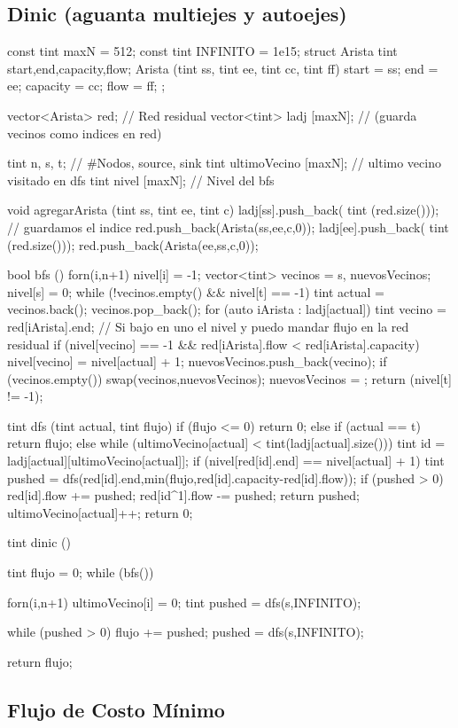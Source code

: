 \subsection{Dinic (aguanta multiejes y autoejes)}
\begin{code}
const tint maxN = 512;
const tint INFINITO = 1e15;
struct Arista
{
	tint start,end,capacity,flow;
	Arista (tint ss, tint ee, tint cc, tint ff)
	{
		start = ss;
		end = ee;
		capacity = cc;
		flow = ff;
	}
};

vector<Arista>  red; // Red residual
vector<tint> ladj [maxN]; // (guarda vecinos como indices en red)

tint n, s, t; // #Nodos, source, sink
tint ultimoVecino [maxN]; // ultimo vecino visitado en dfs
tint nivel [maxN]; // Nivel del bfs

void agregarArista (tint ss, tint ee, tint c)
{
	ladj[ss].push_back( tint (red.size())); // guardamos el indice
	red.push_back(Arista(ss,ee,c,0));
	ladj[ee].push_back( tint (red.size()));
	red.push_back(Arista(ee,ss,c,0));
}


bool bfs ()
{
	forn(i,n+1)
		nivel[i] = -1;
	vector<tint> vecinos = {s}, nuevosVecinos;
	nivel[s] = 0;
	while (!vecinos.empty() && nivel[t] == -1)
	{
		tint actual = vecinos.back();
		vecinos.pop_back();
		for (auto iArista : ladj[actual])
		{
			tint vecino = red[iArista].end;
			// Si bajo en uno el nivel y puedo mandar flujo en la red residual
			if (nivel[vecino] == -1 && red[iArista].flow < red[iArista].capacity) 
			{
				nivel[vecino] = nivel[actual] + 1;
				nuevosVecinos.push_back(vecino);
			}
		}
		if (vecinos.empty())
		{
			swap(vecinos,nuevosVecinos);
			nuevosVecinos = {};
		}
	}
	return (nivel[t] != -1);
}

tint dfs (tint actual, tint flujo)
{
	if (flujo <= 0)
		return 0;
	else if (actual == t)
		return flujo;
	else
	{
		while (ultimoVecino[actual] < tint(ladj[actual].size()))
		{
			tint id = ladj[actual][ultimoVecino[actual]];
			if (nivel[red[id].end] == nivel[actual] + 1)
			{
				tint pushed = dfs(red[id].end,min(flujo,red[id].capacity-red[id].flow));
				if (pushed > 0)
				{
					red[id].flow += pushed;
					red[id^1].flow -= pushed;
					return pushed;
				}
			}
			ultimoVecino[actual]++;
		}
		return 0;	
	}
}

tint dinic ()
{
	tint flujo = 0;
	while (bfs())
	{
		
		forn(i,n+1)
			ultimoVecino[i] = 0;
		tint pushed = dfs(s,INFINITO);
		
		while (pushed > 0)
		{
			flujo += pushed;
			pushed = dfs(s,INFINITO);
		}
	}
	return flujo;
}
\end{code}

\subsection{Flujo de Costo Mínimo}
\begin{code}
\end{code}
